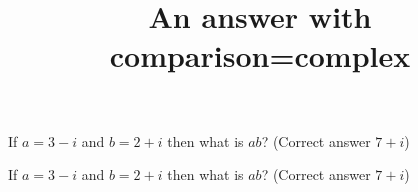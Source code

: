 \documentclass[onepage]{webquiz}
\title{An answer with comparison=complex}
\begin{document}
  \begin{question}     %
     If $a=3-i$ and $b=2+i$ then what is $ab$?
      (Correct answer $7+i$)
  \end{question}
  \begin{question}     %
     If $a=3-i$ and $b=2+i$ then what is $ab$?
      (Correct answer $7+i$)
  \end{question}
\end{document}

